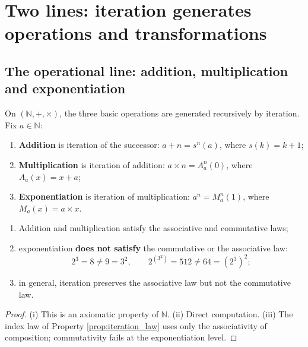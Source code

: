\section{Two lines: iteration generates operations and transformations}
\label{sec:two_lines}

\subsection{The operational line: addition, multiplication and exponentiation}

\begin{definition}\label{def:hyperoperation}
On $(\mathbb{N},+,\times)$, the three basic operations are generated recursively by iteration. Fix $a\in\mathbb{N}$:
\begin{enumerate}[label=(\roman*)]
    \item \textbf{Addition} is iteration of the successor: $a+n=s^n(a)$, where $s(k)=k+1$;
    \item \textbf{Multiplication} is iteration of addition: $a\times n=A_a^n(0)$, where $A_a(x)=x+a$;
    \item \textbf{Exponentiation} is iteration of multiplication: $a^n=M_a^n(1)$, where $M_a(x)=a\times x$.
\end{enumerate}
\end{definition}

\begin{property}\label{prop:hyperoperation_assoc}
\leavevmode\par
\begin{enumerate}[label=(\roman*)]
    \item Addition and multiplication satisfy the associative and commutative laws;
    \item exponentiation \textbf{does not satisfy} the commutative or the associative law:
    \[
    2^3=8\neq 9=3^2,\qquad
    2^{(3^2)}=512\neq 64=(2^3)^2;
    \]
    \item in general, iteration preserves the associative law but not the commutative law.
\end{enumerate}
\end{property}

\begin{proof}
(i) This is an axiomatic property of $\mathbb{N}$. (ii) Direct computation. (iii) The index law of Property \ref{prop:iteration_law} uses only the associativity of composition; commutativity fails at the exponentiation level.
\end{proof}

